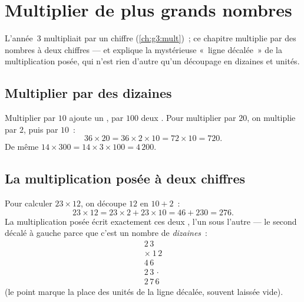 \chapter{Multiplier de plus grands nombres}\label{ch:g4:mult}

L'année~3 multipliait par un chiffre (\cref{ch:g3:mult})~; ce
chapitre multiplie par des nombres à deux chiffres --- et explique la
mystérieuse «~ligne décalée~» de la multiplication posée, qui n'est
rien d'autre qu'un découpage en dizaines et unités.

\section{Multiplier par des dizaines}

\begin{proposition}\label{prop:g4:mult:tens}
Multiplier par $10$ ajoute un , par $100$ deux . Pour
multiplier par $20$, on multiplie par $2$, puis par $10$~:
\[
36 \times 20 = 36 \times 2 \times 10 = 72 \times 10 = 720 .
\]
De même $14 \times 300 = 14 \times 3 \times 100 = 4\,200$.
\end{proposition}
\admitted

\section{La multiplication posée à deux chiffres}

\begin{example}\label{ex:g4:mult:why}
Pour calculer $23 \times 12$, on découpe $12$ en $10 + 2$~:
\[
23 \times 12 = 23 \times 2 + 23 \times 10 = 46 + 230 = 276 .
\]
La multiplication posée écrit exactement ces deux , l'un
sous l'autre --- le second décalé à gauche parce que c'est un nombre
de \emph{dizaines}~:
\[
\begin{array}{r}
2\,3 \\
\times\ 1\,2 \\
\hline
4\,6 \\
2\,3\,\cdot \\
\hline
2\,7\,6
\end{array}
\]
(le point marque la place des unités de la ligne décalée, souvent
laissée vide).
\end{example}

